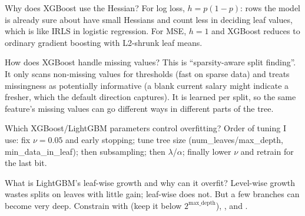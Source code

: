 \begin{qa}{Why does XGBoost use the Hessian?}
\why For log loss, $h = p(1-p)$: rows the model is already sure about have small Hessians and count less in deciding leaf values, which
is like IRLS in logistic regression. For MSE, $h = 1$ and XGBoost reduces to ordinary gradient boosting with L2-shrunk leaf means.
\end{qa}

\begin{qa}{ How does XGBoost handle missing values?}
\why This is ``sparsity-aware split finding''. It only scans non-missing values for thresholds (fast on sparse data) and treats
missingness as potentially informative (a blank current salary might indicate a fresher, which the default direction captures). It is
learned per split, so the same feature's missing values can go different ways in different parts of the tree.
\end{qa}

\begin{qa}{Which XGBoost/LightGBM parameters control overfitting?}
\why Order of tuning I use: fix $\nu = 0.05$ and early stopping; tune tree size (num\_leaves/max\_depth, min\_data\_in\_leaf); then
subsampling; then $\lambda$/$\alpha$; finally lower $\nu$ and retrain for the last bit.
\end{qa}

\begin{qa}{What is LightGBM's leaf-wise growth and why can it overfit?}
\why Level-wise growth wastes splits on leaves with little gain; leaf-wise does not. But a few branches can become very deep.
Constrain with  (keep it below $2^{\text{max\_depth}}$), , and .
\end{qa}

